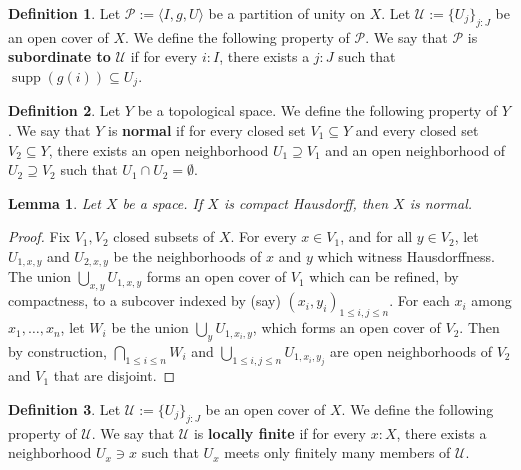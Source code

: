 \documentclass[11pt]{article}
\theoremstyle{plain}
\newtheorem{lemma}{Lemma}[section]
\theoremstyle{definition}
\newtheorem{definition}{Definition}[section]
\newcommand{\supp}{\operatorname{supp}}
\begin{document}
\begin{definition}\label{def:subordinate}
  Let \(\mathscr{P} := \langle I, g, U \rangle\) be a partition of unity on \(X\). Let \(\mathscr{U} := \{U_j\}_{j : J}\) be an open cover of \(X\). We define the following property of \(\mathscr{P}\). We say that \(\mathscr{P}\) is \textbf{subordinate to} \(\mathscr{U}\) if for every \(i : I\), there exists a \(j : J\) such that \(\supp(g(i)) \subseteq U_j\).
\end{definition}

\begin{definition}\label{def:normal-space}
  Let \(Y\) be a topological space. We define the following property of \(Y\). We say that \(Y\) is \textbf{normal} if for every closed set \(V_1 \subseteq Y\) and every closed set \(V_2 \subseteq Y\), there exists an open neighborhood \(U_1 \supseteq V_1\) and an open neighborhood of \(U_2 \supseteq V_2\) such that \(U_1 \cap U_2 = \emptyset\).
\end{definition}

\begin{lemma}\label{lemma:compact-hausdorff-normal}
  Let \(X\) be a space. If \(X\) is compact Hausdorff, then \(X\) is normal.
\end{lemma}

\begin{proof}
  Fix \(V_1, V_2\) closed subsets of \(X\). For every \(x \in V_1\), and for all \(y \in V_2\), let \(U_{1,x,y}\) and \(U_{2,x,y}\) be the neighborhoods of \(x\) and \(y\) which witness Hausdorffness. The union \(\bigcup_{x,y} U_{1,x,y}\) forms an open cover of \(V_1\) which can be refined, by compactness, to a subcover indexed by (say) \((x_i, y_i)_{1 \leq i, j \leq n}\). For each \(x_i\) among \(x_1, \dots, x_n\), let \(W_i\) be the union \(\bigcup_{y} U_{1, x_i, y}\), which forms an open cover of \(V_2\). Then by construction, \(\bigcap_{1 \leq i \leq n} W_i\) and \(\bigcup_{1 \leq i,j \leq n} U_{1,x_i, y_j}\) are open neighborhoods of \(V_2\) and \(V_1\) that are disjoint.
\end{proof}

\begin{definition}\label{def:locally-finite-open-cover}
  Let \(\mathscr{U} := \{U_j\}_{j : J}\) be an open cover of \(X\). We define the following property of \(\mathscr{U}\). We say that \(\mathscr{U}\) is \textbf{locally finite} if for every \(x : X\), there exists a neighborhood \(U_x \ni x\) such that \(U_x\) meets only finitely many members of \(\mathscr{U}\).
\end{definition}
\end{document}
